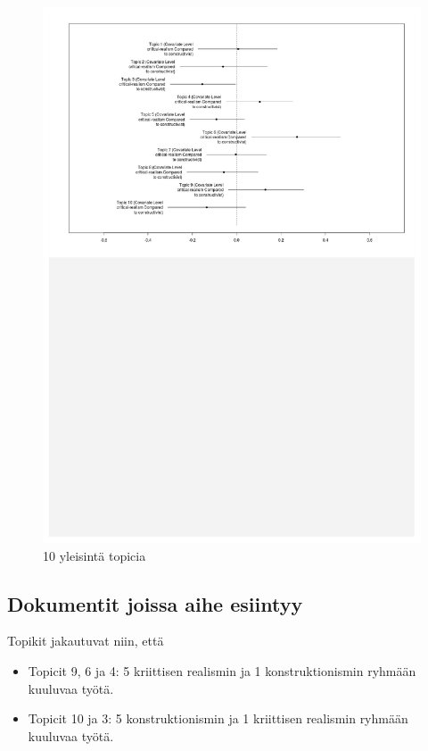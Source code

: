 \begin{figure}[ht!]

\includegraphics{covariate.pdf}

\caption{10 yleisintä topicia}
\label{kuvio2}

\end{figure}

\subsection*{Dokumentit joissa aihe esiintyy}

Topikit jakautuvat niin, että

\begin{itemize}

\item Topicit 9, 6 ja  4: 5 kriittisen realismin ja 1 konstruktionismin ryhmään
  kuuluvaa työtä.

\item Topicit 10 ja 3: 5 konstruktionismin ja 1 kriittisen realismin ryhmään
  kuuluvaa työtä.

\end{itemize}

